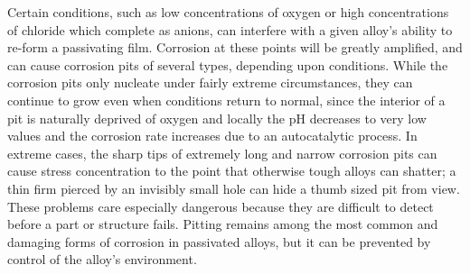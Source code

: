 Certain conditions, such as low concentrations of oxygen or high concentrations of chloride which complete as anions, can interfere with a given alloy's ability to re-form a passivating film. Corrosion at these points will be greatly amplified, and can cause corrosion pits of several types, depending upon conditions. While the corrosion pits only nucleate under fairly extreme circumstances, they can continue to grow even when conditions return to normal, since the interior of a pit is naturally deprived of oxygen and locally the pH decreases to very low values and the corrosion rate increases due to an autocatalytic process. In extreme cases, the sharp tips of extremely long and narrow corrosion pits can cause stress concentration to the point that otherwise tough alloys can shatter; a thin firm pierced by an invisibly small hole can hide a thumb sized pit from view. These problems care especially dangerous because they are difficult to detect before a part or structure fails. Pitting remains among the most common and damaging forms of corrosion in passivated alloys, but it can be prevented by control of the alloy's environment.

